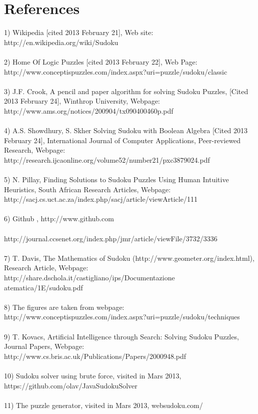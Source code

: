 \documentclass[12pt, letterpaper, twoside]{article}
\begin{document}
    \section{References}
	1) Wikipedia [cited 2013 February 21], Web site: http://en.wikipedia.org/wiki/Sudoku\\ \\
2) Home Of Logic Puzzles [cited 2013 February 22], Web Page:
http://www.conceptispuzzles.com/index.aspx?uri=puzzle/sudoku/classic\\ \\
3) J.F. Crook, A pencil and paper algorithm for solving Sudoku Puzzles, [Cited 2013
February 24], Winthrop University, Webpage:
http://www.ams.org/notices/200904/tx090400460p.pdf\\ \\
4) A.S. Showdhury, S. Skher Solving Sudoku with Boolean Algebra [Cited 2013 February
24], International Journal of Computer Applications, Peer-reviewed Research, Webpage:
http://research.ijcaonline.org/volume52/number21/pxc3879024.pdf \\ \\
5) N. Pillay, Finding Solutions to Sudoku Puzzles Using Human Intuitive Heuristics, South
African Research Articles, Webpage:
http://sacj.cs.uct.ac.za/index.php/sacj/article/viewArticle/111\\ \\
6) Github , http://www.github.com \\ \\
http://journal.ccsenet.org/index.php/jmr/article/viewFile/3732/3336\\ \\
7) T. Davis, The Mathematics of Sudoku (http://www.geometer.org/index.html), Research
Article, Webpage:
http://share.dschola.it/castigliano/ips/Documentazione%
atematica/1E/sudoku.pdf\\ \\
8) The figures are taken from webpage:
http://www.conceptispuzzles.com/index.aspx?uri=puzzle/sudoku/techniques\\ \\
9) T. Kovacs, Artificial Intelligence through Search: Solving Sudoku Puzzles, Journal Papers,
Webpage: http://www.cs.bris.ac.uk/Publications/Papers/2000948.pdf\\ \\
10) Sudoku solver using brute force, visited in Mars 2013,
https://github.com/olav/JavaSudokuSolver\\ \\
11) The puzzle generator, visited in Mars 2013, websudoku.com/\\ \\

	
	
\end{document}
